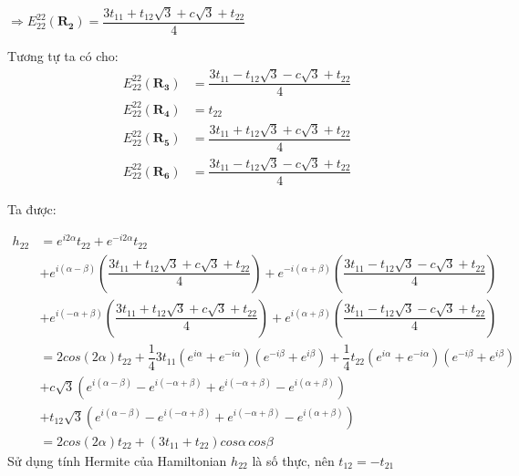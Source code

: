 \documentclass{report}
\begin{document}
$\Rightarrow E_{22}^{22}(\mathbf{R_2}) = \dfrac{3t_{11} + t_{12}\sqrt{3} + c\sqrt{3} + t_{22}}{4}$

Tương tự ta có cho:
\begin{align*}
	E_{22}^{22}(\mathbf{R_3}) & = \dfrac{3t_{11} - t_{12}\sqrt{3} - c\sqrt{3} + t_{22}}{4} \\
	E_{22}^{22}(\mathbf{R_4}) & = t_{22}                                                   \\
	E_{22}^{22}(\mathbf{R_5}) & = \dfrac{3t_{11} + t_{12}\sqrt{3} + c\sqrt{3} + t_{22}}{4} \\
	E_{22}^{22}(\mathbf{R_6}) & = \dfrac{3t_{11} - t_{12}\sqrt{3} - c\sqrt{3} + t_{22}}{4}
\end{align*}

Ta được:

\begin{align*}
	h_{22} & = e^{ i 2 \alpha} t_{22} + e^{- i 2 \alpha} t_{22}                                                                                                                                                                           \\
	       & + e^{i(\alpha - \beta)} \left(\dfrac{3t_{11} + t_{12}\sqrt{3} + c\sqrt{3} + t_{22}}{4}\right) +  e^{-i(\alpha + \beta)} \left(\dfrac{3t_{11} - t_{12}\sqrt{3} - c\sqrt{3} + t_{22}}{4}\right)                                \\
	       & + e^{i(-\alpha + \beta)} \left(\dfrac{3t_{11} + t_{12}\sqrt{3} + c\sqrt{3} + t_{22}}{4}\right) +  e^{i(\alpha + \beta)} \left(\dfrac{3t_{11} - t_{12}\sqrt{3} - c\sqrt{3} + t_{22}}{4}\right)                                \\
	       & = 2 cos(2\alpha) t_{22} + \dfrac{1}{4}3t_{11} \left(e^{i\alpha} + e^{-i\alpha}\right)\left(e^{-i\beta} + e^{i\beta}\right) + \dfrac{1}{4}t_{22} \left(e^{i\alpha} + e^{-i\alpha}\right)\left(e^{-i\beta} + e^{i\beta}\right) \\
	       & + c\sqrt{3}(e^{i(\alpha-\beta)} - e^{i(-\alpha+\beta)} +e^{i(-\alpha+\beta)} - e^{i(\alpha+\beta)})                                                                                                                          \\
	       & + t_{12}\sqrt{3}(e^{i(\alpha-\beta)} - e^{i(-\alpha+\beta)} + e^{i(-\alpha+\beta)} - e^{i(\alpha+\beta)})                                                                                                                    \\
	       & = 2cos(2\alpha) t_{22} + (3t_{11} + t_{22})cos\alpha \, cos\beta
\end{align*}
Sử dụng tính Hermite của Hamiltonian $h_{22}$ là số thực, nên $t_{12}= - t_{21}$
\end{document}
